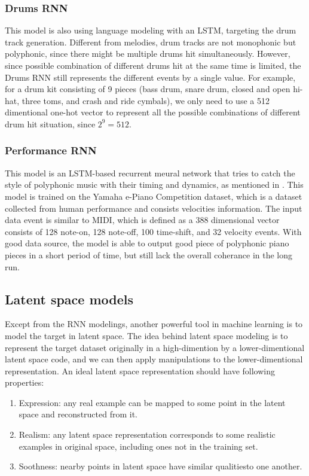 \documentclass[man]{apa6}
\begin{document}
\subsubsection{Drums RNN}
This model is also using language modeling with an LSTM, targeting the drum track generation. Different from melodies, drum tracks are not monophonic but polyphonic, since there might be multiple drums hit simultaneously. However, since possible combination of different drums hit at the same time is limited, the Drums RNN still represents the different events by a single value. For example, for a drum kit consisting of 9 pieces (bass drum, snare drum, closed and open hi-hat, three toms, and crash and ride cymbals), we only need to use a 512 dimentional one-hot vector to represent all the possible combinations of different drum hit situation, since ${2}^{9}=512$.

\subsubsection{Performance RNN}
This model is an LSTM-based recurrent meural network that tries to catch the style of polyphonic music with their timing and dynamics, as mentioned in \textcite{performance-rnn-2017}. This model is trained on the Yamaha e-Piano Competition dataset, which is a dataset collected from human performance and consists velocities information. The input data event is similar to MIDI, which is defined as a 388 dimensional vector consists of 128 note-on, 128 note-off, 100 time-shift, and 32 velocity events. With good data source, the model is able to output good piece of polyphonic piano pieces in a short period of time, but still lack the overall coherance in the long run.

\subsection{Latent space models}
Except from the RNN modelings, another powerful tool in machine learning is to model the target in latent space. The idea behind latent space modeling is to represent the target dataset originally in a high-dimention by a lower-dimentional latent space code, and we can then apply manipulations to the lower-dimentional representation. An ideal latent space representation should have following properties:

\begin{enumerate}
  \item Expression: any real example can be mapped to some point in the latent space and reconstructed from it.
  \item Realism: any latent space representation corresponds to some realistic examples in original space, including ones not in the training set.
  \item Soothness: nearby points in latent space have similar qualitiesto one another.
\end{enumerate}
\end{document}
